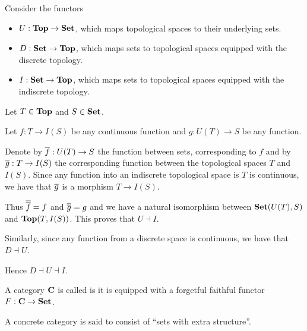 \begin{example}\label{ex:top_adjoint_functor}\cite[example 2.1.5]{Leinster2014}
  Consider the functors
  \begin{itemize}
    \item \( U: \operatorname{\mathbf{Top}} \to \operatorname{\mathbf{Set}} \), which maps topological spaces to their underlying sets.
    \item \( D: \operatorname{\mathbf{Set}} \to \operatorname{\mathbf{Top}} \), which maps sets to topological spaces equipped with the discrete topology.
    \item \( I: \operatorname{\mathbf{Set}} \to \operatorname{\mathbf{Top}} \), which maps sets to topological spaces equipped with the indiscrete topology.
  \end{itemize}

  Let \( T \in \operatorname{\mathbf{Top}} \) and \( S \in \operatorname{\mathbf{Set}} \).

  Let \( f: T \to I(S) \) be any continuous function and \( g: U(T) \to S \) be any function.

  Denote by \( \overline{f}: U(T) \to S \) the function between sets, corresponding to \( f \) and by \( \overline{g}: T \to I(S) \) the corresponding function between the topological spaces \( T \) and \( I(S) \). Since any function into an indiscrete topological space is \( T \) is continuous, we have that \( \overline{g} \) is a morphism \( T \to I(S) \).

  Thus \( \overline{\overline{f}} = f \) and \( \overline{\overline{g}} = g \) and we have a natural isomorphism between \( \operatorname{\mathbf{Set}}(U(T), S) \) and \( \operatorname{\mathbf{Top}}(T, I(S)) \). This proves that \( U \dashv I \).

  Similarly, since any function from a discrete space is continuous, we have that \( D \dashv U \).

  Hence \( D \dashv U \dashv I \).
\end{example}

\begin{definition}\label{def:concrete_category}
  A category \( \operatorname{\mathbf{C}} \) is called  is it is equipped with a forgetful faithful functor \( F: \operatorname{\mathbf{C}} \to \operatorname{\mathbf{Set}} \).

  A concrete category is said to consist of \enquote{sets with extra structure}.
\end{definition}

